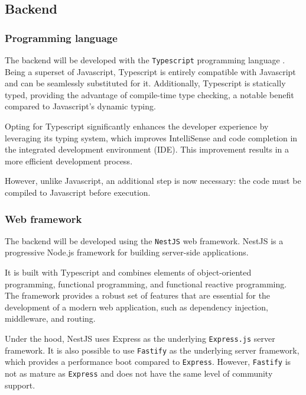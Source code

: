 \documentclass[../main.tex]{subfiles}
\begin{document}
\subsection{Backend}

\subsubsection{Programming language}

The backend will be developed with the \texttt{Typescript} programming language \cite{typescript}.
Being a superset of Javascript, Typescript is entirely compatible with Javascript and can be seamlessly substituted for it.
Additionally, Typescript is statically typed, providing the advantage of compile-time type checking, a notable benefit compared to Javascript's dynamic typing.

Opting for Typescript significantly enhances the developer experience by leveraging its typing system, which improves IntelliSense and code completion in the integrated development environment (IDE).
This improvement results in a more efficient development process.

However, unlike Javascript, an additional step is now necessary: the code must be compiled to Javascript before execution.


\subsubsection{Web framework}

The backend will be developed using the \texttt{NestJS} \cite{nestjs} web framework.
NestJS is a progressive Node.js framework for building server-side applications.

It is built with Typescript and combines elements of object-oriented programming, functional programming, and functional reactive programming.
The framework provides a robust set of features that are essential for the development of a modern web application, such as dependency injection, middleware, and routing.

Under the hood, NestJS uses Express \cite{expressjs} as the underlying \texttt{Express.js} server framework. It is also possible
to use \texttt{Fastify} \cite{fastify} as the underlying server framework, which provides a performance boot compared to \texttt{Express}.
However, \texttt{Fastify} is not as mature as \texttt{Express} and does not have the same level of community support.
\end{document}
